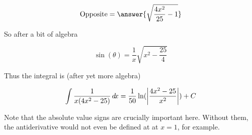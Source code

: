\documentclass{ximera}
\begin{document}
\begin{example}
	\[
	\textrm{Opposite} =  \answer{\sqrt{\frac{4x^2}{25}-1}}
	\]
	
	So after a bit of algebra
	
	\[
	\sin(\theta) = \frac{1}{x} \sqrt{x^2 - \frac{25}{4}}
	\]
	
	Thus the integral is (after yet more algebra)
	
	\[
	\int \frac{1}{x(4x^2 - 25)} \mathop{}\!d\! x = \frac{1}{50} \ln(\left| \frac{4x^2-25}{x^2} \right|)+C
	\]
	
	\begin{warning}
		Note that the absolute value signs are crucially important here.  Without them, the antiderivative would not even be defined at at $x=1$, for example.
	\end{warning}
\end{example}
\end{document}
